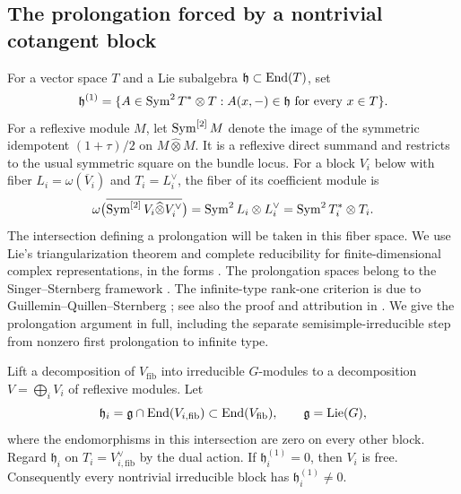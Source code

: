 \subsection{The prolongation forced by a nontrivial cotangent block}

For a vector space $T$ and a Lie subalgebra
$\mathfrak h\subset\operatorname{End}(T)$, set
\[
 \mathfrak h^{(1)}=
 \{A\in\operatorname{Sym}^2T^*\otimes T:
                      A(x,{-})\in\mathfrak h\text{ for every }x\in T\}.
\]
For a reflexive module $M$, let $\operatorname{Sym}^{[2]}M$ denote the image of the symmetric idempotent
$(1+\tau)/2$ on $M\widehat\otimes M$.  It is a reflexive direct
summand and restricts to the usual symmetric square on the bundle
locus.  For a block $V_i$ below with fiber
$L_i=\omega(\overline V_i)$ and $T_i=L_i^\vee$, the fiber of its
coefficient module is
\[
 \omega\bigl(\overline{\operatorname{Sym}^{[2]}V_i\widehat\otimes V_i^\vee}\bigr)
       =\operatorname{Sym}^2L_i\otimes L_i^\vee
       =\operatorname{Sym}^2T_i^*\otimes T_i.
\]
The intersection defining a prolongation will be taken in this fiber
space.
We use Lie's triangularization theorem and complete reducibility
for finite-dimensional complex representations, in the forms
\cite[Theorem 2.2(2), Corollary 2.2(2), Theorem 2.9]{Cap2016}.
The prolongation spaces belong to the Singer--Sternberg framework
\cite{SingerSternberg1965}. The infinite-type rank-one criterion is due
to Guillemin--Quillen--Sternberg \cite{GuilleminQuillenSternberg1967};
see also the proof and attribution in
\cite[Section~2.2 and Theorem~2.3]{OttazziWarhurst2011}.
We give the prolongation argument in full, including the separate
semisimple-irreducible step from nonzero first prolongation to infinite
type.

\begin{lemma}
\label{loc:block-obstruction}
Lift a decomposition of $V_{\mathrm{fib}}$ into irreducible
$G$-modules to a decomposition $V=\bigoplus_iV_i$ of reflexive
modules.  Let
\[
 \mathfrak h_i=
    \mathfrak g\cap\operatorname{End}(V_{i,\mathrm{fib}})
       \subset\operatorname{End}(V_{\mathrm{fib}}),
       \qquad\mathfrak g=\operatorname{Lie}(G),
\]
where the endomorphisms in this intersection are zero on every
other block.  Regard $\mathfrak h_i$ on
$T_i=V_{i,\mathrm{fib}}^\vee$ by the dual action.  If
$\mathfrak h_i^{(1)}=0$, then $V_i$ is free.  Consequently every
nontrivial irreducible block has
$\mathfrak h_i^{(1)}\ne0$.
\end{lemma}

